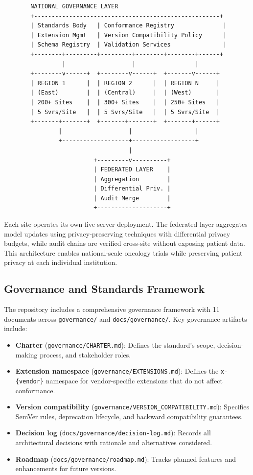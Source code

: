 \documentclass{article}
\begin{document}
\begin{figure}[H]
\begin{verbatim}
  NATIONAL GOVERNANCE LAYER
  +-----------------------------------------------------+
  | Standards Body   | Conformance Registry              |
  | Extension Mgmt   | Version Compatibility Policy      |
  | Schema Registry  | Validation Services               |
  +--------+---------+---------+--------+--------+------+
           |                   |                 |
  +--------v------+  +--------v------+  +-------v------+
  | REGION 1      |  | REGION 2      |  | REGION N     |
  | (East)        |  | (Central)     |  | (West)       |
  | 200+ Sites    |  | 300+ Sites    |  | 250+ Sites   |
  | 5 Svrs/Site   |  | 5 Svrs/Site   |  | 5 Svrs/Site  |
  +-------+-------+  +-------+-------+  +-------+------+
          |                   |                  |
          +-------------------+------------------+
                              |
                    +---------v----------+
                    | FEDERATED LAYER    |
                    | Aggregation        |
                    | Differential Priv. |
                    | Audit Merge        |
                    +--------------------+
\end{verbatim}
\end{figure}

Each site operates its own five-server deployment. The federated layer aggregates model updates using privacy-preserving techniques with differential privacy budgets, while audit chains are verified cross-site without exposing patient data. This architecture enables national-scale oncology trials while preserving patient privacy at each individual institution.

\subsection{Governance and Standards Framework}

The repository includes a comprehensive governance framework with 11 documents across \texttt{governance/} and \texttt{docs/governance/}. Key governance artifacts include:

\begin{itemize}[leftmargin=*]
\item \textbf{Charter} (\texttt{governance/CHARTER.md}): Defines the standard's scope, decision-making process, and stakeholder roles.
\item \textbf{Extension namespace} (\texttt{governance/EXTENSIONS.md}): Defines the \texttt{x-\{vendor\}} namespace for vendor-specific extensions that do not affect conformance.
\item \textbf{Version compatibility} (\texttt{governance/VERSION\_COMPATIBILITY.md}): Specifies SemVer rules, deprecation lifecycle, and backward compatibility guarantees.
\item \textbf{Decision log} (\texttt{docs/governance/decision-log.md}): Records all architectural decisions with rationale and alternatives considered.
\item \textbf{Roadmap} (\texttt{docs/governance/roadmap.md}): Tracks planned features and enhancements for future versions.
\end{itemize}
\end{document}
